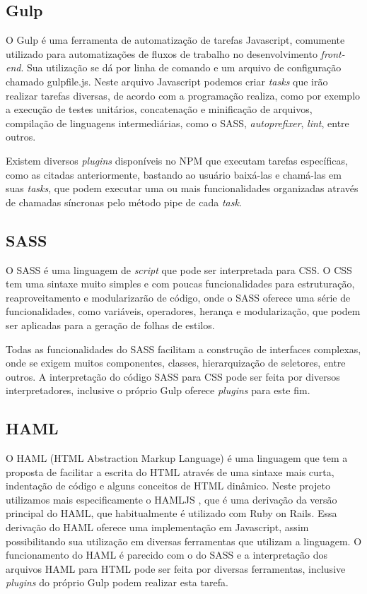\subsection{Gulp}
O Gulp \cite{gulp} é uma ferramenta de automatização de tarefas Javascript, comumente utilizado para automatizações de fluxos de trabalho no desenvolvimento \textit{front-end}. Sua utilização se dá por linha de comando e um arquivo de configuração chamado gulpfile.js. Neste arquivo Javascript podemos criar \textit{tasks} que irão realizar tarefas diversas, de acordo com a programação realiza, como por exemplo a execução de testes unitários, concatenação e minificação de arquivos, compilação de linguagens intermediárias, como o SASS, \textit{autoprefixer}, \textit{lint}, entre outros.

Existem diversos \textit{plugins} disponíveis no NPM que executam tarefas específicas, como as citadas anteriormente, bastando ao usuário baixá-las e chamá-las em suas \textit{tasks}, que podem executar uma ou mais funcionalidades organizadas através de chamadas síncronas pelo método pipe de cada \textit{task}.

\subsection{SASS}
O SASS \cite{sass} é uma linguagem de \textit{script} que pode ser interpretada para CSS. O CSS tem uma sintaxe muito simples e com poucas funcionalidades para estruturação, reaproveitamento e modularizarão de código, onde o SASS oferece uma série de funcionalidades, como variáveis, operadores, herança e modularização, que podem ser aplicadas para a geração de folhas de estilos.

Todas as funcionalidades do SASS facilitam a construção de interfaces complexas, onde se exigem muitos componentes, classes, hierarquização de seletores, entre outros. A interpretação do código SASS para CSS pode ser feita por diversos interpretadores, inclusive o próprio Gulp oferece \textit{plugins} para este fim.

\subsection{HAML}
O HAML (HTML Abstraction Markup Language) \cite{haml} é uma linguagem que tem a proposta de facilitar a escrita do HTML através de uma sintaxe mais curta, indentação de código e alguns conceitos de HTML dinâmico. Neste projeto utilizamos mais especificamente o HAMLJS \cite{hamljs}, que é uma derivação da versão principal do HAML, que habitualmente é utilizado com Ruby on Rails. Essa derivação do HAML oferece uma implementação em Javascript, assim possibilitando sua utilização em diversas ferramentas que utilizam a linguagem. O funcionamento do HAML é parecido com o do SASS e a interpretação dos arquivos HAML para HTML pode ser feita por diversas ferramentas, inclusive \textit{plugins} do próprio Gulp podem realizar esta tarefa.

